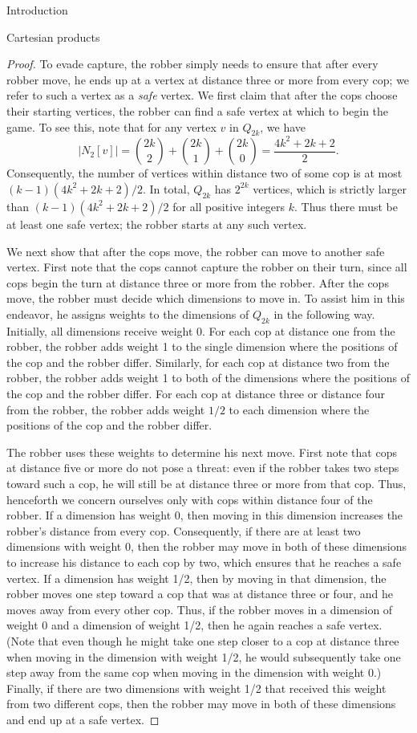\documentclass[12pt]{amsart}
\newcommand{\size}[1]{\left \vert #1 \right \vert}
\theoremstyle{definition}
\begin{document}
\begin{section}{Introduction}
\begin{section}{Cartesian products}
\begin{proof}
To evade capture, the robber simply needs to ensure that after every robber move, he ends up at a vertex at distance three or more from every cop; we refer to such a vertex as a \textit{safe} vertex.  We first claim that after the cops choose their starting vertices, the robber can find a safe vertex at which to begin the game.  To see this, note that for any vertex $v$ in $Q_{2k}$, we have 
\[\size{N_2[v]} = \binom{2k}{2} + \binom{2k}{1} + \binom{2k}{0} = \frac{4k^2+2k+2}{2}.\] 
Consequently, the number of vertices within distance two of some cop is at most $(k-1)(4k^2+2k+2)/2$.  In total, $Q_{2k}$ has $2^{2k}$ vertices, which is strictly larger than $(k-1)(4k^2+2k+2)/2$ for all positive integers $k$.  Thus there must be at least one safe vertex; the robber starts at any such vertex.   
        
We next show that after the cops move, the robber can move to another safe vertex.  First note that the cops cannot capture the robber on their turn, since all cops begin the turn at distance three or more from the robber.  After the cops move, the robber must decide which dimensions to move in.  To assist him in this endeavor, he assigns weights to the dimensions of $Q_{2k}$ in the following way.  Initially, all dimensions receive weight 0.  For each cop at distance one from the robber, the robber adds weight 1 to the single dimension where the positions of the cop and the robber differ.  Similarly, for each cop at distance two from the robber, the robber adds weight 1 to both of the dimensions where the positions of the cop and the robber differ.  For each cop at distance three or distance four from the robber, the robber adds weight $1/2$ to each dimension where the positions of the cop and the robber differ.  
        
The robber uses these weights to determine his next move.  First note that cops at distance five or more do not pose a threat: even if the robber takes two steps toward such a cop, he will still be at distance three or more from that cop.  Thus, henceforth we concern ourselves only with cops within distance four of the robber.  If a dimension has weight 0, then moving in this dimension increases the robber's distance from every cop.  Consequently, if there are at least two dimensions with weight 0, then the robber may move in both of these dimensions to increase his distance to each cop by two, which ensures that he reaches a safe vertex.  If a dimension has weight 1/2, then by moving in that dimension, the robber moves one step toward a cop that was at distance three or four, and he moves away from every other cop.  Thus, if the robber moves in a dimension of weight 0 and a dimension of weight 1/2, then he again reaches a safe vertex.  (Note that even though he might take one step closer to a cop at distance three when moving in the dimension with weight 1/2, he would subsequently take one step away from the same cop when moving in the dimension with weight 0.)  Finally, if there are two dimensions with weight 1/2 that received this weight from two different cops, then the robber may move in both of these dimensions and end up at a safe vertex. 
        

\end{proof}
\end{section}
\end{section}
\end{document}

